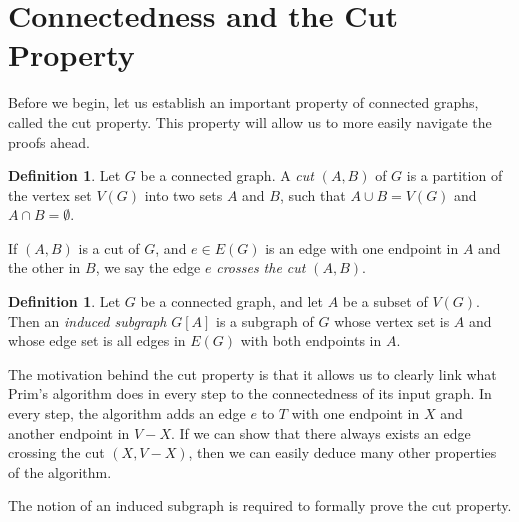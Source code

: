\documentclass[a4paper,11pt]{report}
\theoremstyle{plain}
\theoremstyle{definition}
\newtheorem{defn}[thm]{Definition}
\begin{document}
\section{Connectedness and the Cut Property}

Before we begin, let us establish an important property of connected graphs,
called the cut property. This property will allow us to more easily navigate
the proofs ahead.

\begin{defn}
Let $G$ be a connected graph. A \emph{cut} $(A, B)$ of $G$ is a partition of
the vertex set $V(G)$ into two sets $A$ and $B$, such that $A \cup B = V(G)$
and $A \cap B = \emptyset$.
\end{defn}

If $(A, B)$ is a cut of $G$, and $e \in E(G)$ is an edge with one endpoint in
$A$ and the other in $B$, we say the edge $e$ \emph{crosses the cut} $(A, B)$.

\begin{defn}
Let $G$ be a connected graph, and let $A$ be a subset of $V(G)$. Then an
\emph{induced subgraph} $G[A]$ is a subgraph of $G$ whose vertex set is $A$ and
whose edge set is all edges in $E(G)$ with both endpoints in $A$.
\end{defn}

The motivation behind the cut property is that it allows us to clearly link
what Prim's algorithm does in every step to the connectedness of its input
graph. In every step, the algorithm adds an edge $e$ to $T$ with one endpoint
in $X$ and another endpoint in $V - X$. If we can show that there always exists
an edge crossing the cut $(X,V - X)$, then we can easily deduce many other
properties of the algorithm.

The notion of an induced subgraph is required to formally prove the
cut property.
\end{document}
